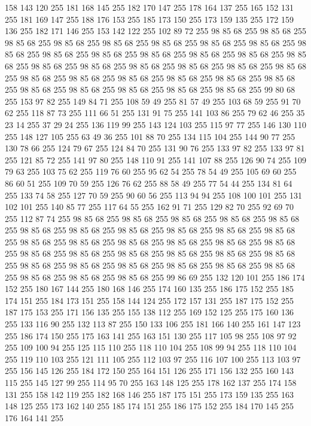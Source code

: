 158 143 120 255 181 168 145 255 182 170 147 255 178 164 137 255 165 152 131 255 181 169 147 255 188 176 153 255 185 173 150 255 173 159 135 255 172 159 136 255 182 171 146 255 153 142 122 255 102 89 72 255 98 85 68 255 98 85 68 255 98 85 68 255 98 85 68 255 98 85 68 255 98 85 68 255 98 85 68 255 98 85 68 255 98 85 68 255 98 85 68 255 98 85 68 255 98 85 68 255 98 85 68 255 98 85 68 255 98 85 68 255 98 85 68 255 98 85 68 255 98 85 68 255 98 85 68 255 98 85 68 255 98 85 68 255 98 85 68 255 98 85 68 255 98 85 68 255 98 85 68 255 98 85 68 255 98 85 68 255 98 85 68 255 98 85 68 255 98 85 68 255 98 85 68 255 98 85 68 255 99 80 68 255 153 97 82 255 149 84 71 255 108 59 49 255 81 57 49 255 103 68 59 255 91 70 62 255 118 87 73 255 111 66 51 255 131 91 75 255 141 103 86 255 79 62 46 255 35 23 14 255 37 29 24 255 136 119 99 255 143 124 103 255 115 97 77 255 146 130 110 255 148 127 105 255
63 49 36 255 101 88 70 255 134 115 104 255 144 90 77 255 130 78 66 255 124 79 67 255 124 84 70 255 131 90 76 255 133 97 82 255 133 97 81 255 121 85 72 255 141 97 80 255 148 110 91 255 141 107 88 255 126 90 74 255 109 79 63 255 103 75 62 255 119 76 60 255 95 62 54 255 78 54 49 255 105 69 60 255 86 60 51 255 109 70 59 255 126 76 62 255 88 58 49 255 77 54 44 255 134 81 64 255 133 74 58 255 127 70 59 255 90 60 56 255 113 94 94 255 108 100 101 255 131 102 101 255 140 85 77 255 117 64 55 255 162 91 71 255 129 82 70 255 92 69 70 255 112 87 74 255 98 85 68 255 98 85 68 255 98 85 68 255 98 85 68 255 98 85 68 255 98 85 68 255 98 85 68 255 98 85 68 255 98 85 68 255 98 85 68 255 98 85 68 255 98 85 68 255 98 85 68 255 98 85 68 255 98 85 68 255 98 85 68 255 98 85 68 255 98 85 68 255 98 85 68 255 98 85 68 255 98 85 68 255 98 85 68 255 98 85 68 255 98 85 68 255 98 85 68 255
98 85 68 255 98 85 68 255 98 85 68 255 98 85 68 255 98 85 68 255 98 85 68 255 98 85 68 255 99 86 69 255 132 120 101 255 186 174 152 255 180 167 144 255 180 168 146 255 174 160 135 255 186 175 152 255 185 174 151 255 184 173 151 255 158 144 124 255 172 157 131 255 187 175 152 255 187 175 153 255 171 156 135 255 155 138 112 255 169 152 125 255 175 160 136 255 133 116 90 255 132 113 87 255 150 133 106 255 181 166 140 255 161 147 123 255 186 174 150 255 175 163 141 255 163 151 130 255 117 105 98 255 108 97 92 255 109 100 94 255 125 115 110 255 118 110 104 255 108 99 94 255 118 110 104 255 119 110 103 255 121 111 105 255 112 103 97 255 116 107 100 255 113 103 97 255 156 145 126 255 184 172 150 255 164 151 126 255 171 156 132 255 160 143 115 255 145 127 99 255 114 95 70 255 163 148 125 255 178 162 137 255 174 158 131 255 158 142 119 255 182 168 146 255 187 175 151 255 173 159 135 255 163 148 125 255 173 162 140 255 185 174 151 255 186 175 152 255 184 170 145 255 176 164 141 255
